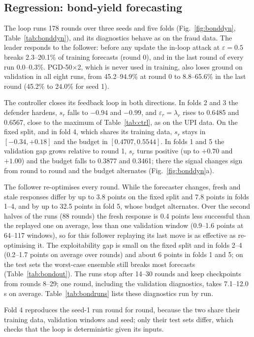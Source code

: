 \documentclass[conference]{IEEEtran}
\begin{document}
\subsection{Regression: bond-yield forecasting}\label{sec:resR}
The loop runs 178 rounds over three seeds and five folds (Fig.~\ref{fig:bonddyn}, Table~\ref{tab:bonddyn}), and its diagnostics behave as on the fraud data. The leader responds to the follower: before any update the in-loop attack at $\varepsilon{=}0.5$ breaks 2.3--20.1\% of training forecasts (round 0), and in the last round of every run 0.0--0.3\%. PGD-50$\times$2, which is never used in training, also loses ground on validation in all eight runs, from 45.2--94.9\% at round 0 to 8.8--65.6\% in the last round (45.2\% to 24.0\% for seed 1).

The controller closes its feedback loop in both directions. In folds 2 and 3 the defender hardens, $s_r$ falls to $-0.94$ and $-0.99$, and $\varepsilon_r{=}\lambda_r$ rises to 0.6485 and 0.6567, close to the maximum of Table~\ref{tab:ctrl}, as on the UPI data. On the fixed split, and in fold 4, which shares its training data, $s_r$ stays in $[-0.34,+0.18]$ and the budget in $[0.4707,0.5544]$. In folds 1 and 5 the validation gap grows relative to round 1, $s_r$ turns positive (up to $+0.70$ and $+1.00$) and the budget falls to 0.3877 and 0.3461; there the signal changes sign from round to round and the budget alternates (Fig.~\ref{fig:bonddyn}a).

The follower re-optimises every round. While the forecaster changes, fresh and stale responses differ by up to 3.8 points on the fixed split and 7.8 points in folds 1--4, and by up to 32.5 points in fold 5, whose budget alternates. Over the second halves of the runs (88 rounds) the fresh response is 0.4 points less successful than the replayed one on average, less than one validation window (0.9--1.6 points at 64--117 windows), so for this follower replaying its last move is as effective as re-optimising it. The exploitability gap is small on the fixed split and in folds 2--4 (0.2--1.7 points on average over rounds) and about 6 points in folds 1 and 5; on the test sets the worst-case ensemble still breaks most forecasts (Table~\ref{tab:bondout}). The runs stop after 14--30 rounds and keep checkpoints from rounds 8--29; one round, including the validation diagnostics, takes 7.1--12.0\,s on average. Table~\ref{tab:bondruns} lists these diagnostics run by run.



Fold 4 reproduces the seed-1 run round for round, because the two share their training data, validation windows and seed; only their test sets differ, which checks that the loop is deterministic given its inputs.
\end{document}
